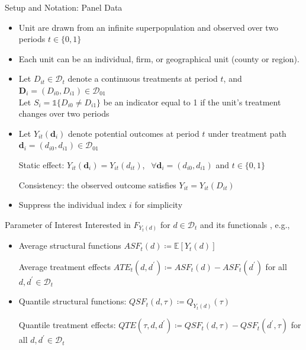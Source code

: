 \documentclass[aspectratio=1610, 9pt]{beamer}
\begin{document}
\begin{frame}{Setup and Notation: Panel Data}

\begin{itemize}
     \item Unit are drawn from an infinite superpopulation and observed over two periods $t\in \{0,1\}$
     \item Each unit can be an individual, firm, or geographical unit (county or region).     
     \item Let $D_{it}\in\mathcal{D}_t$ denote a continuous treatments at period $t$, and $\mathbf{D}_i=(D_{i0},D_{i1})\in \mathcal{D}_{01}$
    \\ 
    Let $S_i=\mathds{1}\{D_{i0}\neq D_{i1}\}$ be an indicator equal to 1 if the unit's treatment changes over two periods
    \item Let $Y_{it}(\mathbf{d}_i)$ denote potential outcomes at period $t$ under treatment path $\mathbf{d}_i=(d_{i0},d_{i1})\in\mathcal{D}_{01}$ 
    
    Static effect: $Y_{it}(\mathbf{d}_i)=Y_{it}(d_{it})$, $\ \ \forall \mathbf{d}_i=(d_{i0},d_{i1})$ and $t\in \{0,1\}$
    
    Consistency: the observed outcome satisfies $Y_{it}=Y_{it}(D_{it})$
    
    \item Suppress the individual index $i$ for simplicity

\end{itemize}



\end{frame}



\begin{frame}{Parameter of Interest}
     Interested in $F_{Y_{t}(d)}$ for $d\in\mathcal{D}_t$ and its functionals , e.g.,
    
    \vspace{0.3cm}

\begin{itemize}
    \item Average structural functions $ASF_{t}(d)\coloneqq\mathbb{E}[Y_{t}(d)]$\\ 
    \vspace{0.2cm}

    Average treatment effects $ATE_t(d,d^{\prime})\coloneqq ASF_{t}(d)-ASF_{t}(d^{\prime})$ for all $d,d^{\prime}\in\mathcal{D}_t$

\vspace{0.2cm}
\item Quantile structural functions: $QSF_{t}(d,\tau)\coloneqq Q_{Y_{t}(d)}(\tau)$\\
\vspace{0.2cm}

Quantile treatment effects: $QTE(\tau,d,d^{\prime})\coloneqq QSF_{t}(d,\tau)-QSF_{t}(d^{\prime},\tau)$ for all $d,d^{\prime}\in\mathcal{D}_t$
\end{itemize} 

\end{frame}
\end{document}

